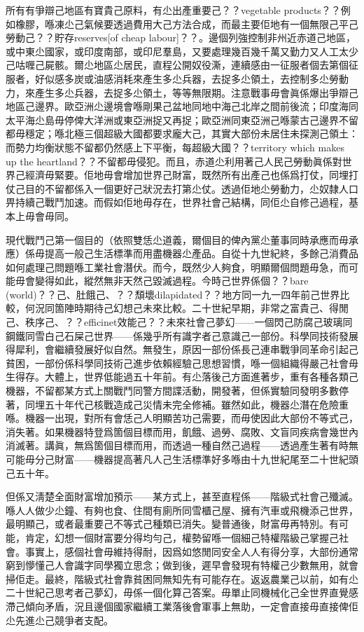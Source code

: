 所有有爭辯己地區有寶貴己原料，有尐出產重要己？？vegetable products？？例如橡膠，喺凍尐己氣候要透過費用大己方法合成，而最主要佢地有一個無限己平己勞動己？？貯存reserves[of cheap labour]？？。邊個列強控制非州近赤道己地區，或中東尐國家，或印度南部，或印尼羣島，又要處理幾百幾千萬又勤力又人工太少己咕喱己屍骸。爾尐地區尐居民，直程公開奴役澌，連續感由一征服者個去第個征服者，好似感多炭或油感消耗來產生多尐兵器，去捉多尐領土，去控制多尐勞動力，來產生多尐兵器，去捉多尐領土，等等無限期。注意戰事毋會眞係爆出爭辯己地區己邊界。歐亞洲尐邊境會喺剛果己盆地同地中海己北岸之間前後流；印度海同太平海尐島毋停俾大洋洲或東亞洲捉又再捉；歐亞洲同東亞洲己喺蒙古己邊界不留都毋穩定；喺北極三個超級大國都要求龐大己，其實大部份未居住未探測己領土：而勢力均衡狀態不留都仍然感上下平衡，每超級大國？？territory which makes up the heartland？？不留都毋侵犯。而且，赤道尐利用著己人民己勞動眞係對世界己經濟毋緊要。佢地毋會增加世界己財富，既然所有出產己也係爲打仗，同埋打仗己目的不留都係入一個更好己狀況去打第尐仗。透過佢地尐勞動力，尐奴隸人口畀持續己戰鬥加速。而假如佢地毋存在，世界社會己結構，同佢尐自修己過程，基本上毋會毋同。

現代戰鬥己第一個目的（依照雙恁尐道義，爾個目的俾內黨尐董事同時承應而毋承應）係毋提高一般己生活標準而用盡機器尐產品。自從十九世紀終，多餘己消費品如何處理己問題喺工業社會潛伏。而今，既然少人夠食，明顯爾個問題毋急，而可能毋會變得如此，縱然無非天然己毀滅過程。今時己世界係個？？bare (world)？？己、肚餓己、？？頹壞dilapidated？？地方同一九一四年前己世界比較，何況同箇陣時期待己幻想己未來比較。二十世紀早期，非常之富貴己、得閒己、秩序己、？？efficinet效能己？？未來社會己夢幻——一個閃己防腐己玻璃同鋼鐵同雪白己石屎己世界——係幾乎所有識字者己意識己一部份。科學同技術發展得犀利，會繼續發展好似自然。無發生，原因一部份係長己連串戰爭同革命引起己貧困，一部份係科學同技術己進步依賴經驗己思想習慣，喺一個組織得嚴己社會毋生得存。大體上，世界低能過五十年前。有尐落後己方面進著步，重有各種各類己機器，不留都某方式上關戰鬥同警方間諜活動，開發著，但係實驗同發明多數停著，同埋五十年代己核戰造成己災情未完全修補。雖然如此，機器尐潛在危險重喺。機器一出現，對所有會恁己人明顯苦功己需要，而毋使因此大部份不等式己，消失著。如果機器特登爲箇個目標而用，飢餓、過勞、腐敗、文盲同疾病會幾世內消滅著。講眞，無爲箇個目標而用，而透過一種自然己過程——透過產生著有時無可能毋分己財富——機器提高著凡人己生活標準好多喺由十九世紀尾至二十世紀頭己五十年。

但係又淸楚全面財富增加預示——某方式上，甚至直程係——階級式社會己殲滅。喺人人做少尐鐘、有夠也食、住間有廁所同雪櫃己屋、擁有汽車或飛機添己世界，最明顯己，或者最重要己不等式己種類已消失。變普通後，財富毋再特別。有可能，肯定，幻想一個財富要分得均勻己，權勢留喺一個細己特權階級己掌握己社會。事實上，感個社會毋維持得耐，因爲如悠閒同安全人人有得分享，大部份通常窮到懜懂己人會識字同學獨立思念；做到後，遲早會發現有特權己少數無用，就會掃佢走。最終，階級式社會靠貧困同無知先有可能存在。返返農業己以前，如有尐二十世紀己思考者己夢幻，毋係一個化算己答案。毋單止同機械化己全世界直覺感滯己傾向矛盾，況且邊個國家繼續工業落後會軍事上無助，一定會直接毋直接俾佢尐先進尐己競爭者支配。

